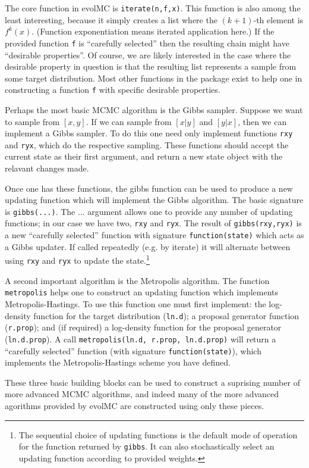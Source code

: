 \documentclass[12pt]{article}\usepackage[]{graphicx}\usepackage[]{color}
\begin{document}
The core function in evolMC is
\texttt{iterate(n,f,x)}. This function is also among the least
interesting, because it simply creates a list where the $(k+1)$-th element
is $f^{k}(x)$. (Function exponentiation means iterated application
here.) If the provided function {\tt f} is ``carefully selected'' then the
resulting chain might have ``desirable properties''. Of course, we are
likely interested in the case where the desirable property in
question is that the resulting list represents a sample from some
target distribution. Most other functions in the package exist to help
one in constructing a function {\tt f} with specific desirable properties.

Perhaps the most basic MCMC algorithm is the Gibbs sampler. Suppose we
want to sample from $[x,y]$. If we can sample from $[x|y]$ and
$[y|x]$, then we can implement a Gibbs sampler. To do this one need
only implement functions {\tt rxy} and {\tt ryx}, which do the
respective sampling. These
functions should accept the current state as their first argument, and
return a new state object with the relavant changes made.

Once one has these functions, the gibbs function can be used to
produce a new updating function which will implement the Gibbs
algorithm. The basic signature is {\tt gibbs(...)}. The ...  argument
allows one to provide any number of updating functions; in our case we
have two, {\tt rxy} and {\tt ryx}. The result of {\tt gibbs(rxy,ryx)}
is a new ``carefully selected'' function with signature
\texttt{function(state)} which acts as a Gibbs updater. If called
repeatedly (e.g. by iterate) it will alternate between using {\tt rxy}
and {\tt ryx} to update the state.\footnote{The sequential choice of
  updating functions is the default mode of operation for the function
  returned by {\tt gibbs}. It can also stochastically select an
  updating function according to provided weights.}

A second important algorithm is the Metropolis algorithm. The function
{\tt metropolis} helps one to construct an updating function which
implements Metropolis-Hastings. To use this function one must first implement:
the log-density function for the target distribution ({\tt ln.d}); a proposal
generator function ({\tt r.prop}); and (if required) a log-density function for the
proposal generator ({\tt ln.d.prop}). A call {\tt metropolis(ln.d,
  r.prop, ln.d.prop)} will return a ``carefully selected'' function
(with signature {\tt function(state)}), which implements the
Metropolis-Hastings scheme you have defined.

These three basic building blocks can be used to construct a suprising
number of more advanced MCMC algorithms, and indeed many of the more
advanced agorithms provided by evolMC are constructed using only these pieces.
\end{document}
